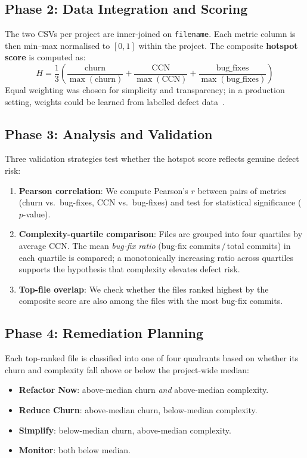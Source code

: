 \documentclass[12pt,a4paper]{article}
\begin{document}
\subsection{Phase 2: Data Integration and Scoring}

The two CSVs per project are inner-joined on \texttt{filename}.
Each metric column is then min--max normalised to $[0,1]$ within the project.
The composite \textbf{hotspot score} is computed as:
\[
  H = \frac{1}{3}\!\left(
    \frac{\text{churn}}{\max(\text{churn})}
    +\frac{\text{CCN}}{\max(\text{CCN})}
    +\frac{\text{bug\_fixes}}{\max(\text{bug\_fixes})}
  \right)
\]
Equal weighting was chosen for simplicity and transparency; in a production setting, weights could be learned from labelled defect data~\cite{nagappan2005}.

\subsection{Phase 3: Analysis and Validation}

Three validation strategies test whether the hotspot score reflects genuine defect risk:

\begin{enumerate}[leftmargin=2em]
  \item \textbf{Pearson correlation}: We compute Pearson's $r$ between pairs of metrics (churn vs.\ bug-fixes, CCN vs.\ bug-fixes) and test for statistical significance ($p$-value).
  \item \textbf{Complexity-quartile comparison}: Files are grouped into four quartiles by average CCN. The mean \emph{bug-fix ratio} (bug-fix commits$\,/\,$total commits) in each quartile is compared; a monotonically increasing ratio across quartiles supports the hypothesis that complexity elevates defect risk.
  \item \textbf{Top-file overlap}: We check whether the files ranked highest by the composite score are also among the files with the most bug-fix commits.
\end{enumerate}

\subsection{Phase 4: Remediation Planning}

Each top-ranked file is classified into one of four quadrants based on whether its churn and complexity fall above or below the project-wide median:

\begin{itemize}[leftmargin=2em]
  \item \textbf{Refactor Now}: above-median churn \emph{and} above-median complexity.
  \item \textbf{Reduce Churn}: above-median churn, below-median complexity.
  \item \textbf{Simplify}: below-median churn, above-median complexity.
  \item \textbf{Monitor}: both below median.
\end{itemize}
\end{document}
